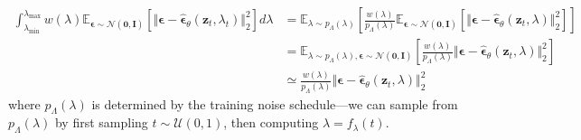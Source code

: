 \documentclass[ oneside,%
                    author={George Herbert},
                    degree={MSci},
                     title={Video Diffusion Models for Climate Simulations},
                  subtitle={}]{dissertation}
\begin{document}
\begin{align}
      \int_{\lambda_{\min}}^{\lambda_{\max}}w(\lambda)\mathbb{E}_{\boldsymbol\epsilon\sim\mathcal{N}(\mathbf{0},\mathbf{I})}\left[\Vert\boldsymbol\epsilon-\hat{\boldsymbol\epsilon}_\theta(\mathbf{z}_t,\lambda_t)\Vert_2^2\right]d\lambda&=\mathbb{E}_{\lambda\sim p_\Lambda(\lambda)}\left[\frac{w(\lambda)}{p_\Lambda(\lambda)}\mathbb{E}_{\boldsymbol\epsilon\sim\mathcal{N}(\mathbf{0},\mathbf{I})}\left[\Vert\boldsymbol\epsilon - \hat{\boldsymbol\epsilon}_\theta(\mathbf{z}_t, \lambda)\Vert_2^2 \right]\right]\\
      &=\mathbb{E}_{\lambda\sim p_\Lambda(\lambda),\boldsymbol\epsilon\sim\mathcal{N}(\mathbf{0}, \mathbf{I})}\left[\frac{w(\lambda)}{p_\Lambda(\lambda)}\Vert \boldsymbol\epsilon-\hat{\boldsymbol\epsilon}_\theta(\mathbf{z}_t,\lambda)\Vert_2^2\right]\\
      &\simeq \frac{w(\lambda)}{p_\Lambda(\lambda)}\Vert \boldsymbol\epsilon-\hat{\boldsymbol\epsilon}_\theta(\mathbf{z}_t,\lambda)\Vert_2^2
\end{align}
where $p_\Lambda(\lambda)$ is determined by the training noise schedule---we can sample from $p_\Lambda(\lambda)$ by first sampling $t\sim\mathcal{U}(0, 1)$, then computing $\lambda=f_\lambda(t)$. 
\end{document}
